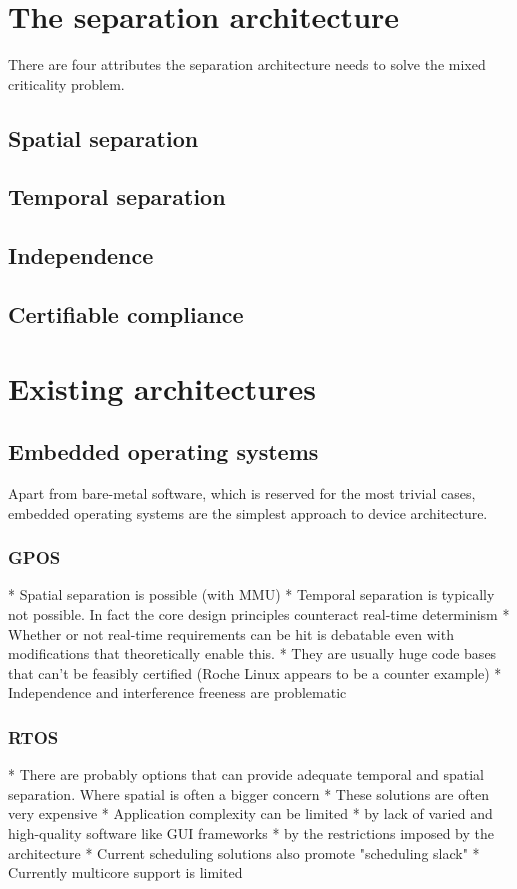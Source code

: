 \section{The separation architecture}
There are four attributes the separation architecture needs to solve the mixed criticality problem.
\subsection{Spatial separation}

\subsection{Temporal separation}

\subsection{Independence}
\subsection{Certifiable compliance}


\section{Existing architectures}
\subsection{Embedded operating systems}
Apart from bare-metal software, which is reserved for the most trivial cases,  embedded operating systems are the simplest approach to device architecture. 
\subsubsection{GPOS}
* Spatial separation is possible (with MMU)
* Temporal separation is typically not possible. In fact the core design principles counteract real-time determinism
* Whether or not real-time requirements can be hit is debatable even with modifications that theoretically enable this.
* They are usually huge code bases that can't be feasibly certified (Roche Linux appears to be a counter example)
* Independence and interference freeness are problematic
\subsubsection{RTOS}
* There are probably options that can provide adequate temporal and spatial separation. Where spatial is often a bigger concern
* These solutions are often very expensive 
* Application complexity can be limited
	* by lack of varied and high-quality software like GUI frameworks
    * by the restrictions imposed by the architecture
 * Current scheduling solutions also promote "scheduling slack"
 * Currently multicore support is limited
